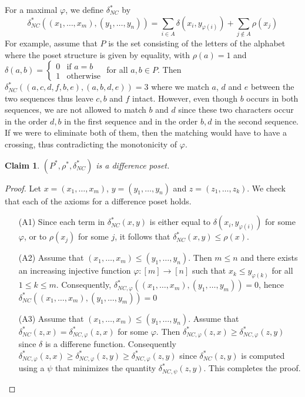 \documentclass[acmsmall,review,anonymous]{acmart}\settopmatter{printfolios=true,printccs=false,printacmref=false}
\newtheorem{claim}{Claim}
\begin{document}
For a maximal $\varphi$, we define $\delta^*_{NC}$ by
$$\delta^*_{NC}((x_1, \ldots, x_m), (y_1, \ldots, y_n)) = \sum_{i \in
A }\delta(x_i, y_{\varphi(i)}) + \sum_{j \not \in A}\rho(x_j)$$
For example, assume that $P$ is the set consisting of the letters of the
alphabet where the poset structure is given by equality, with $\rho(a) = 1$
and $\delta(a, b) = \begin{cases}0 & \text{if } a = b\\ 1 & 
\text{otherwise}\end{cases}$ for all $a, b \in P$. Then $\delta_{NC}^*((a, c,
d, f, b, e), (a, b, d, e)) = 3$ where we match $a$, $d$ and $e$ between the two
sequences thus leave $c, b$ and $f$ intact. However, even though $b$ occurs in
both sequences, we are not allowed to match $b$ and $d$ since these two
characters occur in the order $d, b$ in the first sequence and in the order $b,
d$ in the second sequence. If we were to eliminate both of them, then the
matching would have to have a crossing, thus contradicting the monotonicity of
$\varphi$.
\begin{claim}\label{nocrossingproof}
$(P^*, \rho^*, \delta_{NC}^*)$ is a difference poset.
\end{claim}
\begin{proof}
Let $x = (x_1, \ldots, x_m)$, $y = (y_1, \ldots, y_n)$ and $z = (z_1, \ldots,
z_k)$. We check that each of the axioms for a difference poset holds.
\begin{enumerate}
  \item[(A1)]
  Since each term in $\delta_{NC}^*(x, y)$ is either equal to $\delta(x_i,
  y_{\varphi(i)})$ for some $\varphi$, or to $\rho(x_j)$ for some $j$, it
  follows that $\delta_{NC}^*(x, y) \leq \rho(x)$.
  \item[(A2)]
  Assume that $(x_1, \ldots, x_m) \leq (y_1, \ldots, y_n)$. Then $m \leq
  n$ and there exists an increasing injective function $\varphi:[m]
  \longrightarrow [n]$ such that $x_k \leq y_{\varphi(k)}$ for all $1
  \leq k \leq m$. Consequently, $\delta^*_{NC, \varphi}((x_1, \ldots, x_m),
  (y_1, \ldots, y_m)) = 0$, hence $\delta^*_{NC}((x_1, \ldots, x_m), (y_1,
  \ldots, y_m)) = 0$
  \item[(A3)]
  Assume that $(x_1, \ldots, x_m) \leq (y_1, \ldots, y_n)$. Assume that
  $\delta_{NC}^*(z, x) = \delta_{NC, \varphi}^*(z, x)$ for some
  $\varphi$.
  Then $\delta_{NC, \varphi}^* (z, x) \geq \delta_{NC, \varphi}^*(z, y)$ since
  $\delta$ is a differene function. Consequently $\delta_{NC, \varphi}^* (z, x)
  \geq \delta_{NC, \varphi}^*(z, y) \geq \delta_{NC, \varphi}^*(z, y)$ since
  $\delta_{NC}^*(z, y)$ is computed using a $\psi$ that minimizes the quantity
  $\delta_{NC, \psi}^*(z, y)$. This completes the proof.
\end{enumerate}
\end{proof}
\end{document}
